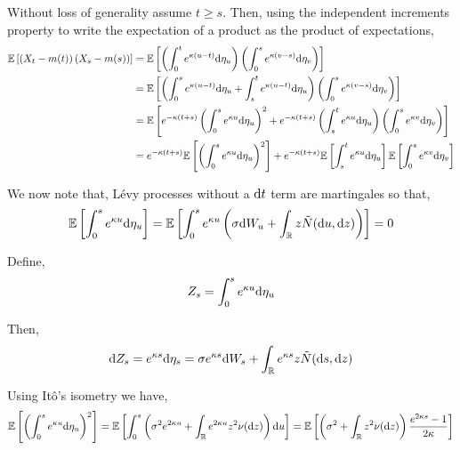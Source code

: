 \begin{solution}[Solution]
\begin{enumerate}[label=(\alph*)]
        Without loss of generality assume \( t\geq s \). Then, using the independent increments property to write the expectation of a product as the product of expectations,
        \begin{align*}
            \mathbb{E} \left[ \left( X_t - m(t) \right) \left( X_s-m(s) \right) \right]
            &= \mathbb{E} \left[ \left( \int_{0}^{t} e^{\kappa(u-t)} \mathrm{d} \eta_u \right) \left( \int_{0}^{s}e^{\kappa(v-s)}\mathrm{d} \eta_v \right) \right]
            \\&= \mathbb{E} \left[ \left( \int_{0}^{s} e^{\kappa(u-t)} \mathrm{d} \eta_u + \int_{s}^{t} e^{\kappa(u-t)} \mathrm{d} \eta_u\right) \left( \int_{0}^{s}e^{\kappa(v-s)}\mathrm{d} \eta_v \right) \right]
            \\&= \mathbb{E} \left[ e^{-\kappa(t+s)} \left(\int_{0}^{s} e^{\kappa u} \mathrm{d} \eta_u \right)^2 + e^{-\kappa(t+s)}\left( \int_{s}^{t} e^{\kappa u} \mathrm{d} \eta_u\right) \left( \int_{0}^{s}e^{\kappa v}\mathrm{d} \eta_v \right) \right] 
            \\&= e^{-\kappa(t+s)}\mathbb{E} \left[ \left(\int_{0}^{s} e^{\kappa u} \mathrm{d} \eta_u \right)^2 \right] + e^{-\kappa(t+s)} \mathbb{E} \left[ \int_{s}^{t} e^{\kappa u} \mathrm{d} \eta_u\right] \mathbb{E}\left[ \int_{0}^{s}e^{\kappa v}\mathrm{d} \eta_v \right] 
        \end{align*}
        
        We now note that, L\'evy processes without a \( \mathrm{d} t \) term are martingales so that,
        \begin{align*}
            \mathbb{E} \left[ \int_{0}^{s} e^{\kappa u} \mathrm{d} \eta_u \right]
            = \mathbb{E} \left[ \int_{0}^{s} e^{\kappa u} \left(\sigma \mathrm{d} W_u + \int_{\mathbb{R}} z \tilde{N}(\mathrm{d} u, \mathrm{d} z) \right) \right] 
            = 0
        \end{align*}
        
        Define,
        \begin{align*}
            Z_s = \int_{0}^{s} e^{\kappa u} \mathrm{d} \eta_u
        \end{align*}

        Then,
        \begin{align*}
            \mathrm{d} Z_s = e^{\kappa s} \mathrm{d} \eta_s 
            = \sigma e^{\kappa s} \mathrm{d} W_s + \int_{\mathbb{R}} e^{\kappa s} z \tilde{N}(\mathrm{d} s,\mathrm{d} z)
        \end{align*}
        
        
        Using It\^o's isometry we have,
        \begin{align*}
            \mathbb{E} \left[ \left( \int_{0}^{s} e^{\kappa u} \mathrm{d} \eta_u \right)^2 \right]
            = \mathbb{E} \left[ \int_{0}^{s} \left(\sigma^2 e^{2\kappa u} + \int_{\mathbb{R}} e^{2\kappa u}z^2 \nu(\mathrm{d} z) \right)\mathrm{d} u \right]
            = \mathbb{E}\left[ \left(\sigma^2 + \int_{\mathbb{R}} z^2 \nu(\mathrm{d} z) \right) \dfrac{e^{2\kappa s}-1}{2\kappa} \right] 
        \end{align*}


\end{enumerate}
\end{solution}
